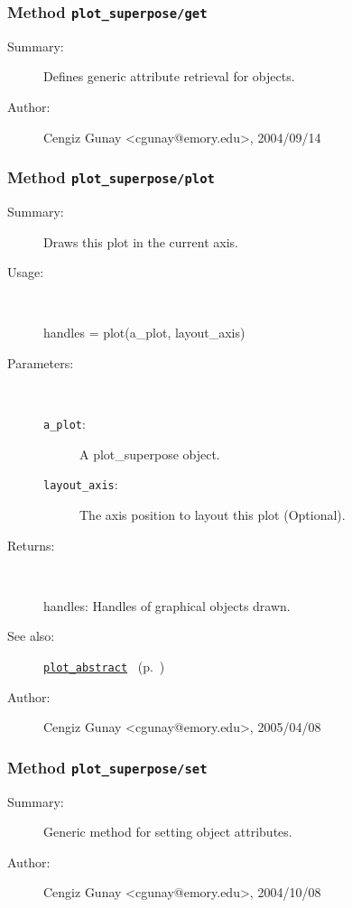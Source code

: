 \subsubsection[Method \texttt{get}]{Method \texttt{plot\_superpose/get}}%
%
\label{ref_plot_superpose__get}%
\hypertarget{ref_plot_superpose__get}{}%
\begin{description}
\item[Summary:]Defines generic attribute retrieval for objects.
%
%
%
%
%
%
%
\item[Author:]%
Cengiz Gunay <cgunay@emory.edu>, 2004/09/14
%
\end{description}
\methodline%
\subsubsection[Method \texttt{plot}]{Method \texttt{plot\_superpose/plot}}%
%
\label{ref_plot_superpose__plot}%
\hypertarget{ref_plot_superpose__plot}{}%
\begin{description}
\item[Summary:]Draws this plot in the current axis.
%
\item[Usage:]~%
\begin{lyxcode}%
handles = plot(a\_plot, layout\_axis)
%
\end{lyxcode}%
%
%
\item[Parameters:]~
\begin{description}%
\item[\texttt{a\_plot}:]
 A plot\_superpose object.
\item[\texttt{layout\_axis}:]
 The axis position to layout this plot (Optional). 
\end{description}%
%
\item[Returns:
]~

	handles: Handles of graphical objects drawn.
%
%
\item[See also:]%
\hyperlink{ref_plot_abstract}{\texttt{plot\_abstract}}%
\ (p.~\pageref{ref_plot_abstract})%
%
%
\item[Author:]%
Cengiz Gunay <cgunay@emory.edu>, 2005/04/08
%
\end{description}
\methodline%
\subsubsection[Method \texttt{set}]{Method \texttt{plot\_superpose/set}}%
%
\label{ref_plot_superpose__set}%
\hypertarget{ref_plot_superpose__set}{}%
\begin{description}
\item[Summary:]Generic method for setting object attributes.
%
%
%
%
%
%
%
\item[Author:]%
Cengiz Gunay <cgunay@emory.edu>, 2004/10/08
%
\end{description}
\methodline%
